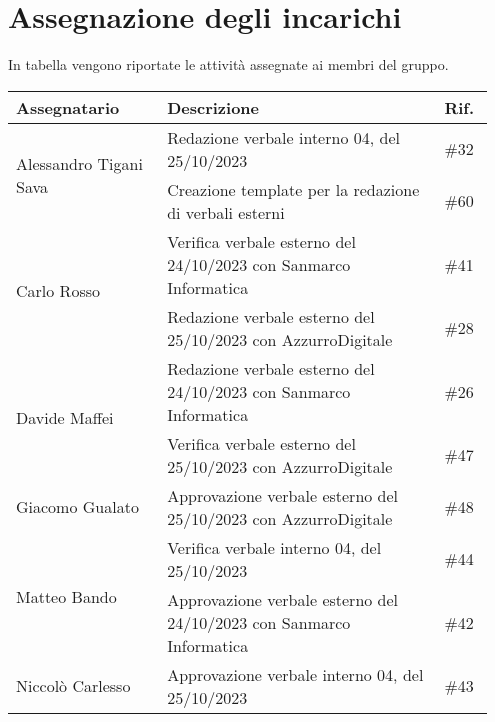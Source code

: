 \section{Assegnazione degli incarichi}
In tabella vengono riportate le attività assegnate ai membri del gruppo.
\begin{center}
    {
    \renewcommand{\arraystretch}{1.5}
    \begin{tabular}{p{0.30\linewidth}|p{0.55\linewidth}|p{0.10\linewidth}}
		\textbf{Assegnatario}   		&   \textbf{Descrizione}   & \textbf{Rif.}     \\
		\hline
		\multirow{2}{*}{Alessandro Tigani Sava}		& Redazione verbale interno 04, del 25/10/2023	& \#32 	\\
		\cline{2-3}
										& Creazione template per la redazione di verbali esterni	& \#60	\\
		\hline
		\multirow{2}{*}{Carlo Rosso}	& Verifica verbale esterno del 24/10/2023 con Sanmarco Informatica      & \#41 	\\
		\cline{2-3}
										& Redazione verbale esterno del 25/10/2023 con AzzurroDigitale	        & \#28 	\\
		\hline
		\multirow{2}{*}{Davide Maffei}	& Redazione verbale esterno del 24/10/2023 con Sanmarco Informatica	    & \#26 	\\
		\cline{2-3}
										& Verifica verbale esterno del 25/10/2023 con AzzurroDigitale           & \#47 	\\
		\hline
		Giacomo Gualato					& Approvazione verbale esterno del 25/10/2023 con AzzurroDigitale	    & \#48 	\\
		\hline
		\multirow{2}{*}{Matteo Bando}	& Verifica verbale interno 04, del 25/10/2023							& \#44 	\\
		\cline{2-3}
										& Approvazione verbale esterno del 24/10/2023 con Sanmarco Informatica	& \#42 	\\
		\hline
		Niccolò Carlesso				& Approvazione verbale interno 04, del 25/10/2023 						& \#43 	\\
    \end{tabular}
    }
\end{center}